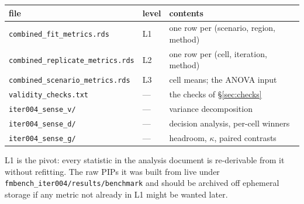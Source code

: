 \documentclass[11pt,a4paper]{article}
\newcommand{\file}[1]{\texttt{\small #1}}
\begin{document}
\begin{center}\small
\begin{tabular}{lll}\toprule
file & level & contents\\\midrule
\file{combined\_fit\_metrics.rds} & L1 & one row per (scenario, region, method)\\
\file{combined\_replicate\_metrics.rds} & L2 & one row per (cell, iteration, method)\\
\file{combined\_scenario\_metrics.rds} & L3 & cell means; the ANOVA input\\
\file{validity\_checks.txt} & --- & the checks of \S\ref{sec:checks}\\
\file{iter004\_sense\_v/} & --- & variance decomposition\\
\file{iter004\_sense\_d/} & --- & decision analysis, per-cell winners\\
\file{iter004\_sense\_g/} & --- & headroom, $\kappa$, paired contrasts\\
\bottomrule\end{tabular}\end{center}

L1 is the pivot: every statistic in the analysis document is re-derivable from
it without refitting. The raw PIPs it was built from live under
\file{fmbench\_iter004/results/benchmark} and should be archived off ephemeral
storage if any metric not already in L1 might be wanted later.
\end{document}
